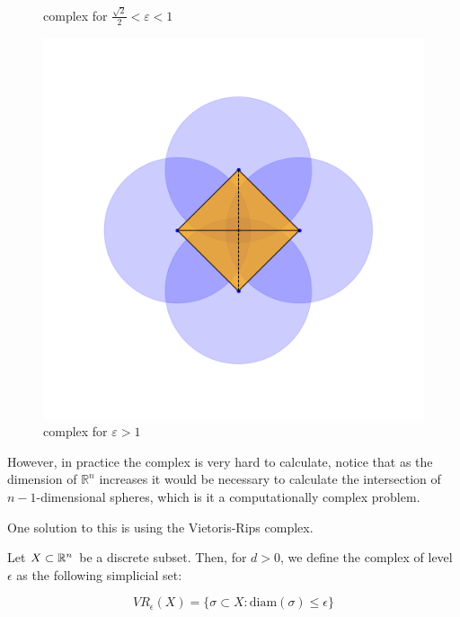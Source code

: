 \begin{example}
\begin{figure}[!htb]
  \caption*{
  {\Cech} complex for $\frac{\sqrt{2}}{2}<\varepsilon<1$
  }
  \label{fig:awesome_image2}
\endminipage\hfill
{}%
  \includegraphics[width=\linewidth]{imgs/cech_example_1_1_2.png}
  \caption*{
  {\Cech} complex for $\varepsilon>1$
  }
  \label{fig:awesome_image3}
\endminipage
\end{figure}

\end{example}

%
%



However, in practice the {\Cech} complex is very hard to calculate,
notice that as the dimension of $\mathbb{R}^n$ increases it would be necessary
to calculate the intersection of $n-1$-dimensional spheres, which is it a
computationally complex problem.

One solution to this is using the 
Vietoris-Rips complex.



\begin{definition}
Let $X\subset \mathbb{R}^n$ be a discrete subset. Then, for $d>0$, we define the \Cech
complex of level $\epsilon$ as the following simplicial set:

$$
VR_\epsilon(X)
=
\{
\sigma \subset X :
\text{diam}(\sigma)\leq \epsilon
\}
$$

\end{definition}

